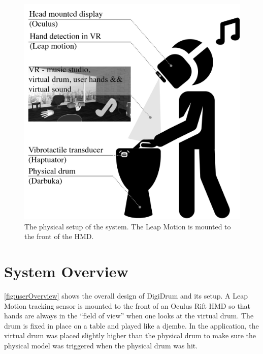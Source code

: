 \documentclass{article}
\begin{document}
\begin{figure}[ht]
\includegraphics[width=1.0\columnwidth]{SMC 2020 paper template LaTeX/Images/VRDrumSetup.png}
\caption{The physical setup of the system. The Leap Motion is mounted to the front of the HMD.}
\centering
\label{fig:userOverview}
\end{figure}

\section{System Overview} \label{sec:sys}

\autoref{fig:userOverview} shows the overall design of DigiDrum and its setup. A Leap Motion tracking sensor is mounted to the front of an Oculus Rift HMD so that hands are always in the ``field of view'' when one looks at the virtual drum. The drum is fixed in place on a table and played like a djembe. In the application, the virtual drum was placed slightly higher than the physical drum to make sure the physical model was triggered when the physical drum was hit.
\end{document}
